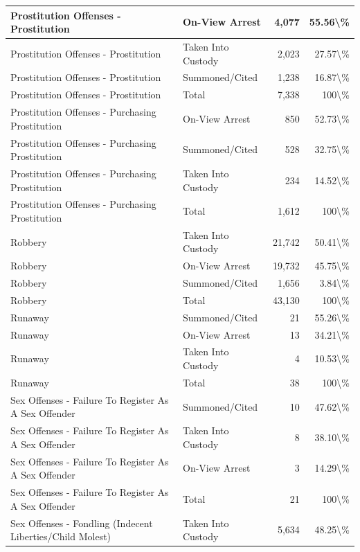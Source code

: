 \documentclass[
]{krantz}
\begin{document}
\begin{longtable}[t]{l|l|r|r}
\hline
Prostitution Offenses - Prostitution & On-View Arrest & 4,077 & 55.56\textbackslash{}\%\\
\hline
Prostitution Offenses - Prostitution & Taken Into Custody & 2,023 & 27.57\textbackslash{}\%\\
\hline
Prostitution Offenses - Prostitution & Summoned/Cited & 1,238 & 16.87\textbackslash{}\%\\
\hline
Prostitution Offenses - Prostitution & Total & 7,338 & 100\textbackslash{}\%\\
\hline
Prostitution Offenses - Purchasing Prostitution & On-View Arrest & 850 & 52.73\textbackslash{}\%\\
\hline
Prostitution Offenses - Purchasing Prostitution & Summoned/Cited & 528 & 32.75\textbackslash{}\%\\
\hline
Prostitution Offenses - Purchasing Prostitution & Taken Into Custody & 234 & 14.52\textbackslash{}\%\\
\hline
Prostitution Offenses - Purchasing Prostitution & Total & 1,612 & 100\textbackslash{}\%\\
\hline
Robbery & Taken Into Custody & 21,742 & 50.41\textbackslash{}\%\\
\hline
Robbery & On-View Arrest & 19,732 & 45.75\textbackslash{}\%\\
\hline
Robbery & Summoned/Cited & 1,656 & 3.84\textbackslash{}\%\\
\hline
Robbery & Total & 43,130 & 100\textbackslash{}\%\\
\hline
Runaway & Summoned/Cited & 21 & 55.26\textbackslash{}\%\\
\hline
Runaway & On-View Arrest & 13 & 34.21\textbackslash{}\%\\
\hline
Runaway & Taken Into Custody & 4 & 10.53\textbackslash{}\%\\
\hline
Runaway & Total & 38 & 100\textbackslash{}\%\\
\hline
Sex Offenses - Failure To Register As A Sex Offender & Summoned/Cited & 10 & 47.62\textbackslash{}\%\\
\hline
Sex Offenses - Failure To Register As A Sex Offender & Taken Into Custody & 8 & 38.10\textbackslash{}\%\\
\hline
Sex Offenses - Failure To Register As A Sex Offender & On-View Arrest & 3 & 14.29\textbackslash{}\%\\
\hline
Sex Offenses - Failure To Register As A Sex Offender & Total & 21 & 100\textbackslash{}\%\\
\hline
Sex Offenses - Fondling (Indecent Liberties/Child Molest) & Taken Into Custody & 5,634 & 48.25\textbackslash{}\%\\

\end{longtable}
\end{document}
